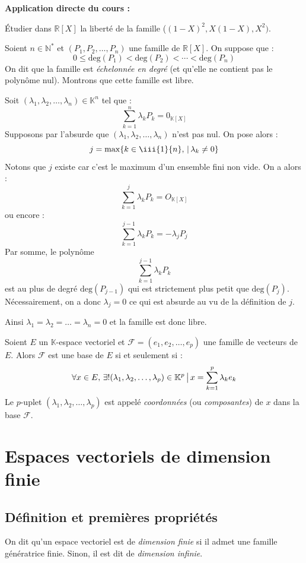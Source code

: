 \documentclass[french,11pt,twoside]{VcCours}
\newenvironment{ApplicationDirecte}{\textbf{Application directe du cours :}

}{}
\begin{document}
\begin{ApplicationDirecte} Étudier dans $\mathbb{R}[X]$ la liberté de la famille ($(1-X)^2,X(1-X),X^2)$.
\end{ApplicationDirecte}
\begin{Exemple} Soient $n \in \mathbb{N}^*$ et $(P_1, P_2, \ldots, P_n)$ une famille de $\mathbb{R}[X]$. On suppose que :
$$ 0 \leq \textrm{deg}(P_1) < \textrm{deg}(P_2) < \cdots < \textrm{deg}(P_n)$$
On dit que la famille est \emph{échelonnée en degré} (et qu'elle ne contient pas le polynôme nul). Montrons que cette famille est libre.

\medskip

Soit $(\lambda_1, \lambda_2, \ldots, \lambda_n) \in \mathbb{K}^n$ tel que :
$$ \sum_{k=1}^n \lambda_k P_k = 0_{\mathbb{K}[X]}$$
Supposons par l'absurde que $(\lambda_1, \lambda_2, \ldots, \lambda_n)$ n'est pas nul. On pose alors :
$$ j = \max \lbrace k \in \iii{1}{n}, \, \vert \, \lambda_k \neq 0 \rbrace$$
Notons que $j$ existe car c'est le maximum d'un ensemble fini non vide. On a alors :
$$ \sum_{k=1}^j \lambda_k P_k = O_{\mathbb{K}[X]}$$
ou encore :
$$ \sum_{k=1}^{j-1} \lambda_k P_k = - \lambda_j P_j $$
Par somme, le polynôme
$$\sum_{k=1}^{j-1} \lambda_k P_k $$
est au plus de degré $\textrm{deg}(P_{j-1})$ qui est strictement plus petit que $\textrm{deg}(P_{j})$. Nécessairement, on a donc $\lambda_j = 0$ ce qui est absurde au vu de la définition de $j$.

Ainsi $\lambda_1 = \lambda_2 = \ldots = \lambda_n = 0$ et la famille est donc libre.
\end{Exemple}

\begin{TheoremeDefinition}{} 
Soient $E$ un $\mathbb{K}$-espace vectoriel et $\mathcal{F} = (e_1, e_2, \ldots, e_p)$ une famille de vecteurs de $E$. Alors $\mathcal{F}$ est une base de $E$ si et seulement si :
$$ \forall x \in E, \, \exists  ! (\lambda_1, \lambda_2, \ldots, \lambda_p) \in \mathbb{K}^p \, \big{\vert} \, x = \sum_{k=1}^p \lambda_k e_k$$
Le $p$-uplet $(\lambda_1, \lambda_2, \ldots, \lambda_p)$ est appelé \emph{coordonnées} (ou \emph{composantes}) de $x$ dans la base $\mathcal{F}$.
\end{TheoremeDefinition}

\section{Espaces vectoriels de dimension finie}
 \subsection{Définition et premières propriétés}
 \begin{Definition}{} On dit qu'un espace vectoriel est de \emph{dimension finie} si il admet une famille génératrice finie. Sinon, il est dit de \emph{dimension infinie}.
 \end{Definition}
 
\end{document}
